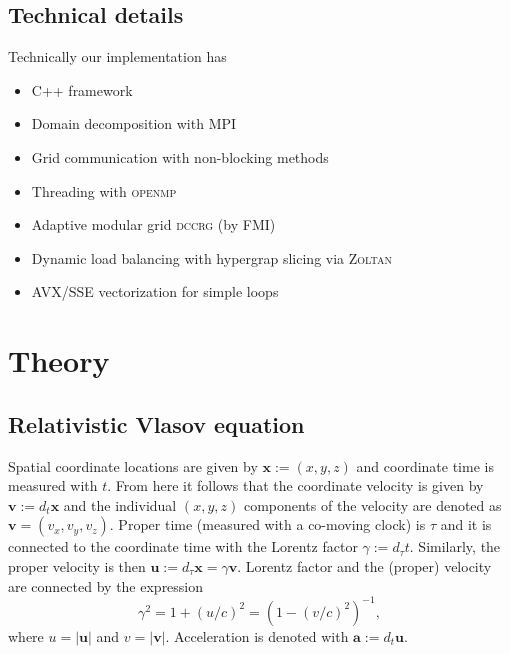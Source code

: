 \documentclass{aa}
\newcommand{\be}{\begin{equation}}
\newcommand{\ee}{\end{equation}}
\renewcommand{\vec}[1]{\ensuremath{\boldsymbol{#1}}}
\begin{document}
\subsection{Technical details}
Technically our implementation has
\begin{itemize}
    \item C++ framework 
    \item Domain decomposition with \textsc{MPI}
    \item Grid communication with non-blocking methods 
    \item Threading with \textsc{openmp}
    \item Adaptive modular grid \textsc{dccrg} (by FMI)
    \item Dynamic load balancing with hypergrap slicing via \textsc{Zoltan}
    \item AVX/SSE vectorization for simple loops
\end{itemize}


\section{Theory}\label{sect:theory}

\subsection{Relativistic Vlasov equation}
Spatial coordinate locations are given by $\vec{x} := (x,y,z)$ and coordinate time is measured with $t$.
From here it follows that the coordinate velocity is given by $\vec{v} := d_t \vec{x}$ and the individual $(x,y,z)$ components of the velocity are denoted as $\vec{v} = (v_x, v_y, v_z)$.
Proper time (measured with a co-moving clock) is $\tau$ and it is connected to the coordinate time with the Lorentz factor $\gamma := d_{\tau} t$.
Similarly, the proper velocity is then $\vec{u} := d_{\tau} \vec{x} = \gamma \vec{v}$.
Lorentz factor and the (proper) velocity are connected by the expression
\be
\gamma^2 = 1 + (u/c)^2 = (1-(v/c)^2)^{-1},
\ee
where $u = |\vec{u}|$ and $v = |\vec{v}|$.
Acceleration is denoted with $\vec{a} := d_t \vec{u}$.
\end{document}
